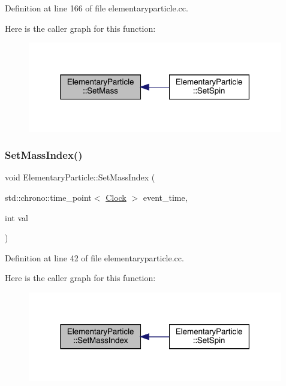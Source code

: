 Definition at line 166 of file elementaryparticle.\+cc.

Here is the caller graph for this function\+:\nopagebreak
\begin{figure}[H]
\begin{center}
\leavevmode
\includegraphics[width=316pt]{class_elementary_particle_a778ff8188ecb369e533521ed4f94b034_icgraph}
\end{center}
\end{figure}
\mbox{\label{class_elementary_particle_a8a3b91409772f4091a782624a34024e7}} 
\subsubsection{\texorpdfstring{Set\+Mass\+Index()}{SetMassIndex()}}
{\footnotesize\ttfamily void Elementary\+Particle\+::\+Set\+Mass\+Index (\begin{DoxyParamCaption}\item[{std\+::chrono\+::time\+\_\+point$<$ \hyperlink{universe_8h_a0ef8d951d1ca5ab3cfaf7ab4c7a6fd80}{Clock} $>$}]{event\+\_\+time,  }\item[{int}]{val }\end{DoxyParamCaption})}



Definition at line 42 of file elementaryparticle.\+cc.

Here is the caller graph for this function\+:\nopagebreak
\begin{figure}[H]
\begin{center}
\leavevmode
\includegraphics[width=316pt]{class_elementary_particle_a8a3b91409772f4091a782624a34024e7_icgraph}
\end{center}
\end{figure}
\mbox{\label{class_elementary_particle_a437fa86d88157314b84662b158d52353}} 
